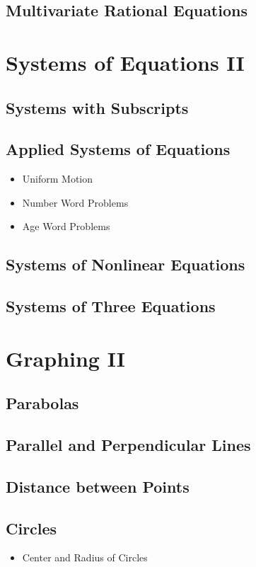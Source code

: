 \documentclass[11pt]{article}
\begin{document}
\subsection{Multivariate Rational Equations}

\setcounter{section}{12}
\section{Systems of Equations II}
\subsection{Systems with Subscripts}
\subsection{Applied Systems of Equations}
\begin{itemize}
    \item Uniform Motion
    \item Number Word Problems
    \item Age Word Problems
\end{itemize}
\subsection{Systems of Nonlinear Equations}
\subsection{Systems of Three Equations}

\setcounter{section}{13}
\section{Graphing II}
\subsection{Parabolas}
\subsection{Parallel and Perpendicular Lines}
\subsection{Distance between Points}
\subsection{Circles}
\begin{itemize}
    \item Center and Radius of Circles
\end{itemize}
\end{document}
